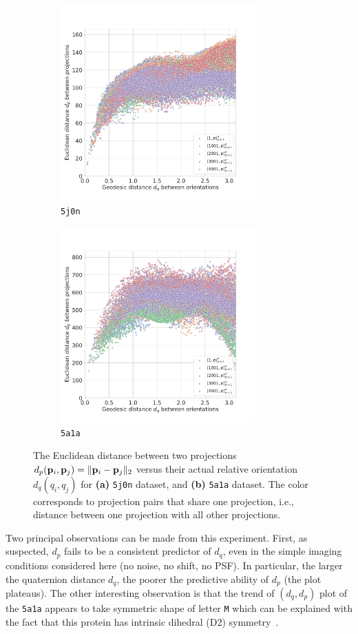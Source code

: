 \begin{figure}[ht!]
    \centering
    \begin{subfigure}[t]{0.45\textwidth}
        \includegraphics[height=7.5cm]{figures/eucl_notrobust_5j0n}
        \caption{\texttt{5j0n}}
    \end{subfigure}
    \hfill
    \begin{subfigure}[t]{0.45\textwidth}
        \includegraphics[height=7.5cm]{figures/eucl_notrobust_5a1a}
        \caption{\texttt{5a1a}}
    \end{subfigure}
    \caption{
        The Euclidean distance between two projections $d_p(\mathbf{p}_i, \mathbf{p}_j) = \Vert \mathbf{p}_i - \mathbf{p}_j \Vert_2$ versus their actual relative orientation $d_q(q_i, q_j)$ for \textbf{(a)} \texttt{5j0n} dataset, and \textbf{(b)} \texttt{5a1a} dataset.
        The color corresponds to projection pairs that share one projection, i.e., distance between one projection with all other projections.
    }\label{fig:euclidean-not-robust}
\end{figure}

Two principal observations can be made from this experiment.
First, as suspected, $d_p$ fails to be a consistent predictor of $d_q$, even in the simple imaging conditions considered here (no noise, no shift, no PSF).
In particular, the larger the quaternion distance $d_q$, the poorer the predictive ability of $d_p$ (the plot plateaus).
The other interesting observation is that the trend of $(d_q,d_p)$ plot of the \texttt{5a1a} appears to take symmetric shape of letter \texttt{M} which can be explained with the fact that this protein has intrinsic dihedral (D2) symmetry~\cite{noauthor_d2sym_nodate,noauthor_5a1asym_nodate}.

